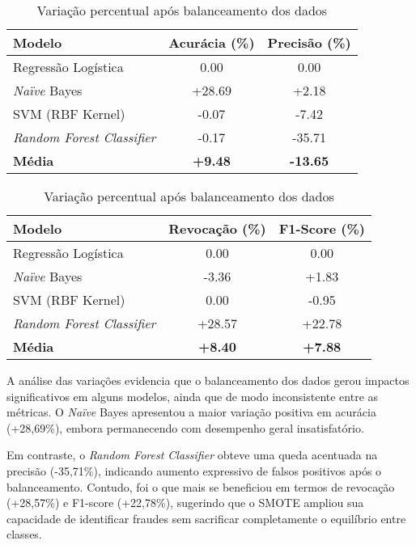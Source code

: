 \documentclass[conference]{IEEEtran}
\begin{document}
\begin{table}[h]
\centering
\caption{Variação percentual após balanceamento dos dados}
\label{tab:variacao_balanceamento}
    \begin{tabular}{lcc}
    \hline
    \textbf{Modelo} & \textbf{Acurácia (\%)} & \textbf{Precisão (\%)} \\ \hline
    Regressão Logística & 0.00 & 0.00 \\
    \textit{Naïve} Bayes         & +28.69 & +2.18 \\
    SVM (RBF Kernel)    & -0.07  & -7.42 \\
    \textit{Random Forest Classifier}& -0.17  & -35.71 \\ \hline
    \textbf{Média}      & \textbf{+9.48} & \textbf{-13.65} \\ \hline
    \end{tabular}
    
    \vspace{0.3cm}
    
    \begin{tabular}{lcc}
    \hline
    \textbf{Modelo} & \textbf{Revocação (\%)} & \textbf{F1-Score (\%)} \\ \hline
    Regressão Logística & 0.00 & 0.00 \\
    \textit{Naïve} Bayes         & -3.36 & +1.83 \\
    SVM (RBF Kernel)    & 0.00  & -0.95 \\
    \textit{Random Forest Classifier}& +28.57 & +22.78 \\ \hline
    \textbf{Média}      & \textbf{+8.40} & \textbf{+7.88} \\ \hline
    \end{tabular}
\end{table}

A análise das variações evidencia que o balanceamento dos dados gerou impactos significativos em alguns modelos, ainda que de modo inconsistente entre as métricas. O \textit{Naïve} Bayes apresentou a maior variação positiva em acurácia (+28,69\%), embora permanecendo com desempenho geral insatisfatório. 

Em contraste, o \textit{Random Forest Classifier} obteve uma queda acentuada na precisão (-35,71\%), indicando aumento expressivo de falsos positivos após o balanceamento. Contudo, foi o que mais se beneficiou em termos de revocação (+28,57\%) e F1-score (+22,78\%), sugerindo que o SMOTE ampliou sua capacidade de identificar fraudes sem sacrificar completamente o equilíbrio entre classes. 
\end{document}
